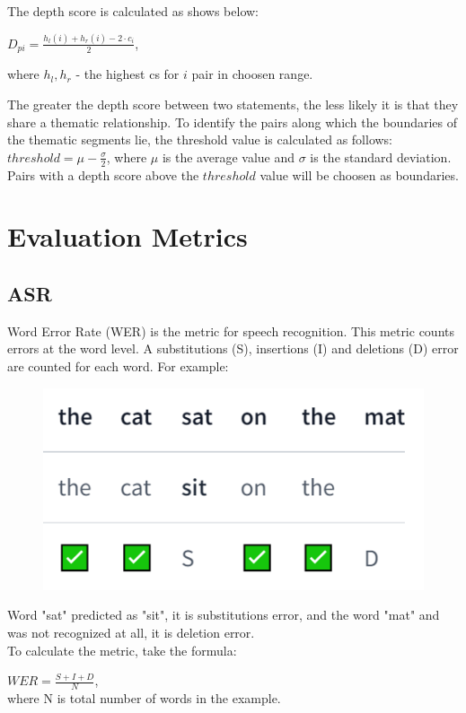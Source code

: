 \documentclass[PMI,VKR]{HSEUniversity}
\begin{document}
The depth score is calculated as shows below: 
\begin{center}
    $D_{pi} = \frac{h_{l}(i) + h_{r}(i) - 2 \cdot c_{i}}{2}$,
\end{center}
where $h_{l}, h_{r}$ - the highest cs for $i$ pair in choosen range.

The greater the depth score between two statements, the less likely it is that they share a thematic relationship. 
To identify the pairs along which the boundaries of the thematic segments lie, the threshold value is calculated as follows: $threshold = \mu - \frac{\sigma}{2}$, where $\mu$ is the average value and $\sigma$ is the standard deviation. Pairs with a depth score above the $threshold$ value will be choosen as boundaries.


\section{Evaluation Metrics}

\subsection{ASR}

Word Error Rate (WER) is the metric for speech recognition. This metric counts errors at the word level. 
A substitutions (S), insertions (I) and deletions (D) error are counted for each word.
For example:

\begin{figure}[h]
    \includegraphics[scale=1]{img/wer.png}
\end{figure}

Word "sat" predicted as "sit", it is substitutions error, and the word "mat" and was not recognized at all, it is deletion error.\\
To calculate the metric, take the formula:

$WER = \frac{S + I + D}{N}$, \\
where N is total number of words in the example.
\end{document}
